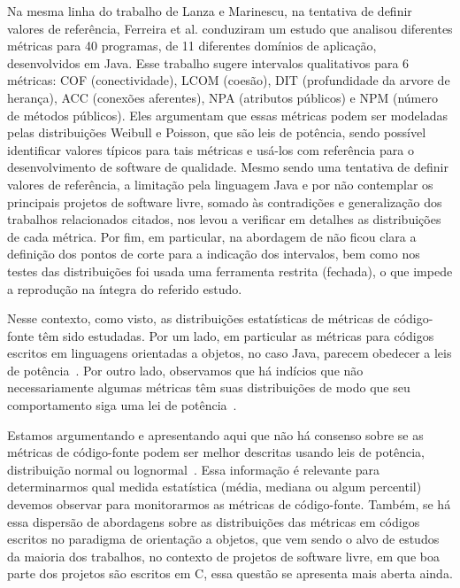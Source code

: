\documentclass{llncs}
\begin{document}
Na mesma linha do trabalho de Lanza e Marinescu\cite{Lanza2006}, na tentativa
de definir valores de referência, Ferreira et al.\cite{Ferreira2009} conduziram
um estudo que analisou diferentes métricas para 40 programas, de 11 diferentes
domínios de aplicação, desenvolvidos em Java.
%
Esse trabalho sugere intervalos qualitativos para 6 métricas: COF
(conectividade), LCOM (coesão), DIT (profundidade da arvore de herança), ACC
(conexões aferentes), NPA (atributos públicos) e NPM (número de métodos
públicos).
%
Eles argumentam que essas métricas podem ser modeladas pelas distribuições
Weibull e Poisson, que são leis de potência, sendo possível identificar valores
típicos para tais métricas e usá-los com referência para o desenvolvimento de
software de qualidade.
%
Mesmo sendo uma tentativa de definir valores de referência, a limitação pela
linguagem Java e por não contemplar os principais projetos de software livre,
somado às contradições e generalização dos trabalhos relacionados citados, nos
levou a verificar em detalhes as distribuições de cada métrica.
%
Por fim, em particular, na abordagem de \cite{Ferreira2009} não ficou clara a
definição dos pontos de corte para a indicação dos intervalos, bem como nos
testes das distribuições foi usada uma ferramenta restrita (fechada), o que
impede a reprodução na íntegra do referido
estudo\cite{meirelles2013monitoramento}.


Nesse contexto, como visto, as distribuições estatísticas de métricas de
código-fonte têm sido estudadas.
%
Por um lado, em particular as métricas para códigos escritos em linguagens
orientadas a objetos, no caso Java, parecem obedecer a leis de
potência~\cite{Wheeldon2003, Potanin2005, Concas2007, Ferreira2009, Yao2009}.
%
Por outro lado, observamos que há indícios que não necessariamente algumas
métricas têm suas distribuições de modo que seu comportamento siga uma lei de
potência~\cite{Baxter2006, Lanza2006, Herraiz2011, Herraiz2012}.

Estamos argumentando e apresentando aqui que não há consenso sobre se as
métricas de código-fonte podem ser melhor descritas usando leis de potência,
distribuição normal ou lognormal~\cite{meirelles2013monitoramento}.
%
Essa informação é relevante para determinarmos qual medida estatística (média,
mediana ou algum percentil) devemos observar para monitorarmos as métricas de
código-fonte.
%
Também, se há essa dispersão de abordagens sobre as distribuições das métricas
em códigos escritos no paradigma de orientação a objetos, que vem sendo o alvo
de estudos da maioria dos trabalhos, no contexto de projetos de software livre,
em que boa parte dos projetos são escritos em C\cite{robles2006:mining-large},
essa questão se apresenta mais aberta ainda.
\end{document}
